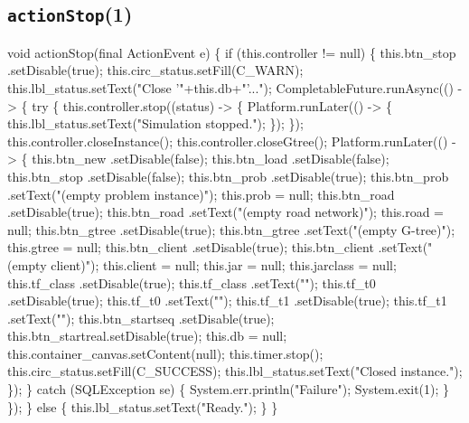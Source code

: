 \subsection{\texttt{actionStop}(1)}
\nwenddocs{}\endmoddef{}
void actionStop(final ActionEvent e) \{
  if (this.controller != null) \{
    this.btn_stop     .setDisable(true);
    this.circ_status.setFill(C_WARN);
    this.lbl_status.setText("Close '"+this.db+"'...");
    CompletableFuture.runAsync(() -> \{
      try \{
        this.controller.stop((status) -> \{
          Platform.runLater(() -> \{
            this.lbl_status.setText("Simulation stopped.");
          \});
        \});
        this.controller.closeInstance();
        this.controller.closeGtree();
        Platform.runLater(() -> \{
          this.btn_new      .setDisable(false);
          this.btn_load     .setDisable(false);
          this.btn_stop     .setDisable(false);
          this.btn_prob     .setDisable(true);
          this.btn_prob     .setText("(empty problem instance)");
          this.prob = null;
          this.btn_road     .setDisable(true);
          this.btn_road     .setText("(empty road network)");
          this.road = null;
          this.btn_gtree    .setDisable(true);
          this.btn_gtree    .setText("(empty G-tree)");
          this.gtree = null;
          this.btn_client   .setDisable(true);
          this.btn_client   .setText("(empty client)");
          this.client = null;
          this.jar = null;
          this.jarclass = null;
          this.tf_class     .setDisable(true);
          this.tf_class     .setText("");
          this.tf_t0        .setDisable(true);
          this.tf_t0        .setText("");
          this.tf_t1        .setDisable(true);
          this.tf_t1        .setText("");
          this.btn_startseq .setDisable(true);
          this.btn_startreal.setDisable(true);
          this.db = null;
          this.container_canvas.setContent(null);
          this.timer.stop();
          this.circ_status.setFill(C_SUCCESS);
          this.lbl_status.setText("Closed instance.");
        \});
      \} catch (SQLException se) \{
        System.err.println("Failure");
        System.exit(1);
      \}
    \});
  \} else \{
    this.lbl_status.setText("Ready.");
  \}
\}
\eatline
{}\nwendcode{}\nwdocspar
